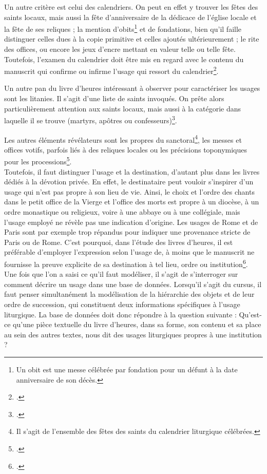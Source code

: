 \documentclass[a4paper,12pt,twoside]{book}
\begin{document}
	Un autre critère est celui des calendriers. On peut en effet y trouver les fêtes des saints locaux, mais aussi la fête d'anniversaire de la dédicace de l'église locale et la fête de ses reliques ; la mention d'obits\footnote{Un obit est une messe célébrée par fondation pour un défunt à la date anniversaire de son décès.} et de fondations, bien qu'il faille distinguer  celles dues à la copie primitive et celles ajoutés ultérieurement ; le rite des offices, ou encore les jeux d'encre mettant en valeur telle ou telle fête. Toutefois, l'examen du calendrier doit être mis en regard avec le contenu du manuscrit qui confirme ou infirme l'usage qui ressort du calendrier\footcite{usages_lit}.
	
	Un autre pan du livre d'heures intéressant à observer pour caractériser les usages sont les litanies. Il s'agit d'une liste de saints invoqués. On prête alors particulièrement attention aux saints locaux, mais aussi à la catégorie dans laquelle il se trouve (martyrs, apôtres ou confesseurs)\footcite{usages_lit}. 
	
	Les autres éléments révélateurs sont les propres du sanctoral\footnote{Il s'agit de l'ensemble des fêtes des saints du calendrier liturgique célébrées.}, les messes et offices votifs, parfois liés à des reliques locales ou les précisions toponymiques pour les processions\footcite{usages_lit}. \\
	
	Toutefois, il faut distinguer l'usage et la destination, d'autant plus dans les livres dédiés à la dévotion privée. En effet, le destinataire peut vouloir s'inspirer d'un usage qui n'est pas propre à son lieu de vie. Ainsi, le choix et l'ordre des chants dans le petit office de la Vierge et l'office des morts est propre à un diocèse, à un ordre monastique ou religieux, voire à une abbaye ou à une collégiale, mais l'usage employé ne révèle pas une indication d'origine. Les usages de Rome et de Paris sont par exemple trop répandus pour indiquer une provenance stricte de Paris ou de Rome. C'est pourquoi, dans l'étude des livres d'heures, il est préférable d'employer l'expression \og selon l'usage de\fg{}, à moins que le manuscrit ne fournisse la preuve explicite de sa destination à tel lieu, ordre ou institution\footcite[p. 5]{initiation_man_lit}.\\
	
	Une fois que l'on a saisi ce qu'il faut modéliser, il s'agit de s'interroger sur comment décrire un usage dans une base de données. Lorsqu'il s'agit du cursus, il faut penser simultanément la modélisation de la hiérarchie des objets et de leur ordre de succession, qui constituent deux informations spécifiques à l’usage liturgique. La base de données doit donc répondre à la question suivante : Qu’est-ce qu'une pièce textuelle du livre d’heures, dans sa forme, son contenu et sa place au sein des autres textes, nous dit des usages liturgiques propres à une institution ? \\
	
\end{document}
